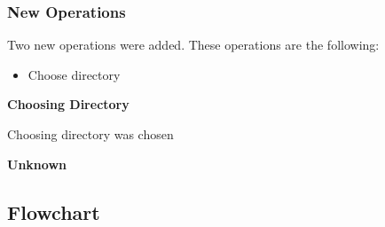 \documentclass[a4paper]{article}
\theoremstyle{plain}
\theoremstyle{definition}
\theoremstyle{remark}
\begin{document}
\subsubsection{New Operations}
Two new operations were added. These operations are the following:
\begin{itemize}
	\item Choose directory
	
\end{itemize}
\textbf{Choosing Directory} \\
\begin{flushleft}
	
Choosing directory was chosen
\end{flushleft}
\textbf{Unknown} \\
\begin{flushleft}
	

\end{flushleft}
\subsection{Flowchart}


\newpage


\end{document}
